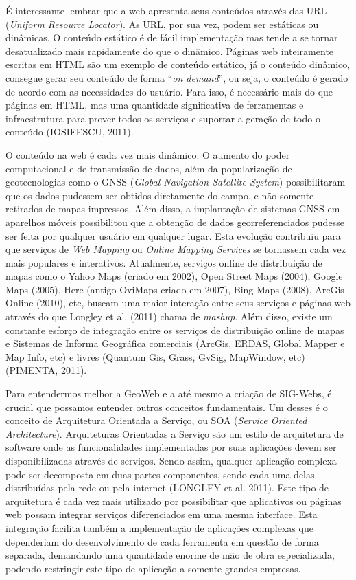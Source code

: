 		É interessante lembrar que a web apresenta seus conteúdos através das URL (\textit{Uniform Resource Locator}). As URL, por sua vez, podem ser estáticas ou dinâmicas. O conteúdo estático é de fácil implementação mas tende a se tornar desatualizado mais rapidamente do que o dinâmico. Páginas web inteiramente escritas em HTML são um exemplo de conteúdo estático, já o conteúdo dinâmico, consegue gerar seu conteúdo de forma “\textit{on demand}”, ou seja, o conteúdo é gerado de acordo com as necessidades do usuário. Para isso, é necessário mais do que páginas em HTML, mas uma quantidade significativa de ferramentas e infraestrutura para prover todos os serviços e suportar a geração de todo o conteúdo (IOSIFESCU, 2011)\cite{IOSIFESCU_11}.
		
		O conteúdo na web é cada vez mais dinâmico. O aumento do poder computacional e de transmissão de dados, além da popularização de geotecnologias como o GNSS (\textit{Global Navigation Satellite System}) possibilitaram que os dados pudessem ser obtidos diretamente do campo, e não somente retirados de mapas impressos. Além disso, a implantação de sistemas GNSS em aparelhos móveis possibilitou que a obtenção de dados georreferenciados pudesse ser feita por qualquer usuário em qualquer lugar. Esta evolução contribuiu para que serviços de \textit{Web Mapping} ou \textit{Online Mapping Services} se tornassem cada vez mais populares e interativos. Atualmente, serviços online de distribuição de mapas como o Yahoo Maps (criado em 2002), Open Street Maps (2004), Google Maps (2005), Here (antigo OviMaps criado em 2007), Bing Maps (2008), ArcGis Online (2010), etc, buscam uma maior interação entre seus serviços e páginas web através do que Longley et al. (2011)\cite{LONGLEY_etal13} chama de \textit{mashup}. Além disso, existe um constante esforço de integração entre os serviços de distribuição online de mapas e Sistemas de Informa Geográfica comerciais (ArcGis, ERDAS, Global Mapper e Map Info, etc) e livres (Quantum Gis, Grass, GvSig, MapWindow, etc) (PIMENTA, 2011)\cite{PIMENTA}.
		
		Para entendermos melhor a GeoWeb e a até mesmo a criação de SIG-Webs, é crucial que possamos entender outros conceitos fundamentais. Um desses é o conceito de Arquitetura Orientada a Serviço, ou SOA (\textit{Service Oriented Architecture}). Arquiteturas Orientadas a Serviço são um estilo de arquitetura de software onde as funcionalidades implementadas por suas aplicações devem ser disponibilizadas através de serviços. Sendo assim, qualquer aplicação complexa pode ser decomposta em duas partes componentes, sendo cada uma delas distribuídas pela rede ou pela internet (LONGLEY et al. 2011)\cite{LONGLEY_etal13}. Este tipo de arquitetura é cada vez mais utilizado por possibilitar que aplicativos ou páginas web possam integrar serviços diferenciados em uma mesma interface. Esta integração facilita também a implementação de aplicações complexas que dependeriam do desenvolvimento de cada ferramenta em questão de forma separada, demandando uma quantidade enorme de mão de obra especializada, podendo restringir este tipo de aplicação a somente grandes empresas.
		

